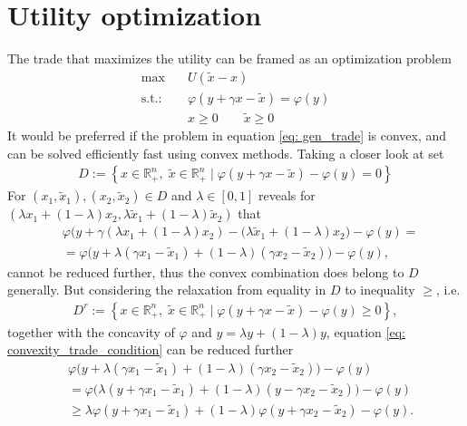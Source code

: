 \section{Utility optimization}
The trade that maximizes the utility can be framed as an optimization problem
\begin{align}
    \text{max} \quad &U(\tilde{x} - x) \label{eq: gen_trade}\\
    \text{s.t.:}\quad & \varphi(y + \gamma x - \tilde{x}) =
    \varphi(y)\nonumber \\
      &x\ge 0 \qquad \tilde{x} \ge 0\nonumber
\end{align}
It would be preferred if the problem in equation \ref{eq: gen_trade} is
convex, and can be solved efficiently fast using convex methods. Taking a
closer look at set
\begin{align}
    D := \left\{ x \in \mathbb{R}^{n}_+,\; \tilde{x} \in \mathbb{R}^{n}_+\;
    |\;
    \varphi(y + \gamma x - \tilde{x}) - \varphi(y) =0
\right\}
\end{align}
For $(x_1, \tilde{x}_1), (x_2, \tilde{x}_2) \in D$ and $\lambda \in [0, 1]$
reveals for $\left(\lambda x_1 + (1-\lambda)x_2, \lambda \tilde{x}_1
+(1-\lambda)\tilde{x}_2\right)$ that
\begin{align}
    &\varphi\Big( y+\gamma(\lambda x_1 + (1-\lambda)x_2) - (\lambda
    \tilde{x}_1 + (1-\lambda)x_2 \Big) - \varphi(y) =\\
    &=
    \varphi\Big(y + \lambda(\gamma x_1 - \tilde{x}_1) + (1-\lambda)(\gamma
    x_2 - \tilde{x}_2)\Big) - \varphi(y),\label{eq: convexity_trade_condition}
\end{align}
cannot be reduced further, thus the convex combination does belong to $D$
generally. But considering the relaxation from equality in $D$ to inequality
$\ge$, i.e.
\begin{align}
    D^{r} := \left\{ x \in \mathbb{R}^{n}_+,\; \tilde{x} \in \mathbb{R}^{n}_+\;
    |\;
    \varphi(y + \gamma x - \tilde{x}) - \varphi(y) \ge 0
\right\},
\end{align}
together with the concavity of $\varphi$ and $y = \lambda y + (1-\lambda)y$,
equation \ref{eq: convexity_trade_condition} can be reduced further
\begin{align}
    &\varphi\Big(y + \lambda(\gamma x_1 - \tilde{x}_1) + (1-\lambda)(\gamma
    x_2 - \tilde{x}_2)\Big) - \varphi(y) \\
    &=
    \varphi\Big(\lambda(y + \gamma x_1 - \tilde{x}_1) + (1-\lambda)(y - \gamma
    x_2 - \tilde{x}_2)\Big) - \varphi(y) \\
    &\ge \lambda \varphi(y + \gamma x_1 - \tilde{x}_1)
    + (1-\lambda)\varphi(y+\gamma x_2 - \tilde{x}_2) - \varphi(y).
\end{align}
